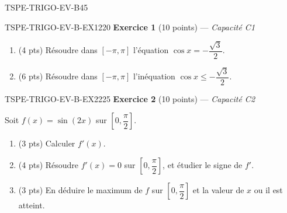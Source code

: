 

\begin{evaluation}{TSPE-TRIGO-EV-B}{45}

\begin{exercice}{TSPE-TRIGO-EV-B-EX1}{2}{20}
\textbf{Exercice 1} (10 points) — \textit{Capacité C1}

\medskip

\begin{enumerate}
  \item (4 pts) Résoudre dans $[-\pi,\pi]$ l'équation $\cos x = -\dfrac{\sqrt{3}}{2}$.
  \item (6 pts) Résoudre dans $[-\pi,\pi]$ l'inéquation $\cos x \leq -\dfrac{\sqrt{3}}{2}$.
\end{enumerate}
\end{exercice}

\begin{exercice}{TSPE-TRIGO-EV-B-EX2}{2}{25}
\textbf{Exercice 2} (10 points) — \textit{Capacité C2}

\medskip

Soit $f(x) = \sin(2x)$ sur $\left[0, \dfrac{\pi}{2}\right]$.
\begin{enumerate}
  \item (3 pts) Calculer $f'(x)$.
  \item (4 pts) Résoudre $f'(x)=0$ sur $\left[0,\dfrac{\pi}{2}\right]$, et étudier le signe de $f'$.
  \item (3 pts) En déduire le maximum de $f$ sur $\left[0,\dfrac{\pi}{2}\right]$ et la valeur de $x$ ou il est atteint.
\end{enumerate}
\end{exercice}

\end{evaluation}
